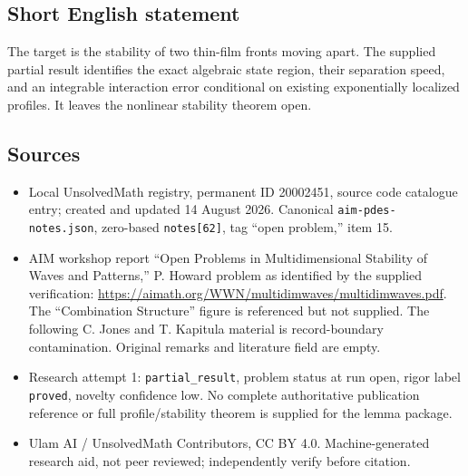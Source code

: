 \documentclass[11pt]{article}
\begin{document}
\subsection{Short English statement}
The target is the stability of two thin-film fronts moving apart. The supplied partial result identifies the exact algebraic state region, their separation speed, and an integrable interaction error conditional on existing exponentially localized profiles. It leaves the nonlinear stability theorem open.
\subsection{Sources}
\begin{itemize}
\item Local UnsolvedMath registry, permanent ID 20002451, source code catalogue entry; created and updated 14 August 2026. Canonical \texttt{aim-pdes-notes.json}, zero-based \texttt{notes[62]}, tag ``open problem,'' item 15.
\item AIM workshop report ``Open Problems in Multidimensional Stability of Waves and Patterns,'' P. Howard problem as identified by the supplied verification: \url{https://aimath.org/WWN/multidimwaves/multidimwaves.pdf}. The ``Combination Structure'' figure is referenced but not supplied. The following C. Jones and T. Kapitula material is record-boundary contamination. Original remarks and literature field are empty.
\item Research attempt 1: \texttt{partial\_result}, problem status at run open, rigor label \texttt{proved}, novelty confidence low. No complete authoritative publication reference or full profile/stability theorem is supplied for the lemma package.
\item Ulam AI / UnsolvedMath Contributors, CC BY 4.0. Machine-generated research aid, not peer reviewed; independently verify before citation.
\end{itemize}
\end{document}
